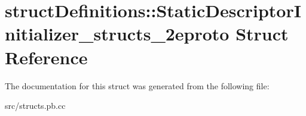 \hypertarget{structstruct_definitions_1_1_static_descriptor_initializer__structs__2eproto}{}\section{struct\+Definitions\+:\+:Static\+Descriptor\+Initializer\+\_\+structs\+\_\+2eproto Struct Reference}
\label{structstruct_definitions_1_1_static_descriptor_initializer__structs__2eproto}


The documentation for this struct was generated from the following file\+:\begin{DoxyCompactItemize}
\item 
src/structs.\+pb.\+cc\end{DoxyCompactItemize}
